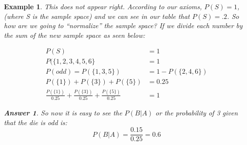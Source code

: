 \documentclass{article}
\newtheorem*{ans}{Answer}
\newtheorem{ex}{Example}
\begin{document}
\begin{ex}
This does not appear right. According to our axioms, $P(S) = 1$, (where S is the sample space) and we can see in our table that $P(S) = .2$. So how are we going to ``normalize'' the sample space? If we divide each number by the sum of the new sample space as seen below:


\begin{align*} \label{cond}
              P(S)                           &= 1 \\
              P(\{1,2,3,4,5,6\}              &= 1 \\
              P(odd) = P(\{1,3,5\})          &= 1 - P(\{2,4,6\}) \\
              P(\{1\}) + P(\{3\}) + P(\{5\}) &= 0.25 \\
              \frac{P(\{1\})}{0.25} + \frac{P(\{3\})}{0.25} + \frac{P(\{5\})}{0.25} &= 1
\end{align*}

\begin{ans} 
So now it is easy to see the $P(B|A)$ or the probability of 3 given that the die is odd is: $$P(B|A) = \frac{0.15}{0.25} = 0.6$$
\end{ans}


\end{ex}
\end{document}
